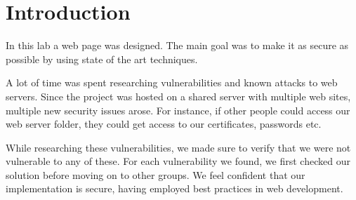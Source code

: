 \section{Introduction}

In this lab a web page was designed.
The main goal was to make it as secure as possible by using state of the art techniques.

A lot of time was spent researching vulnerabilities and known attacks to web servers.
Since the project was hosted on a shared server with multiple web sites, multiple new security issues arose.
For instance, if other people could access our web server folder, they could get access to our certificates, passwords etc.

While researching these vulnerabilities, we made sure to verify that we were not vulnerable to any of these.
For each vulnerability we found, we first checked our solution before moving on to other groups.
We feel confident that our implementation is secure, having employed best practices in web development.
